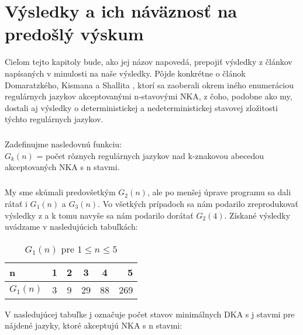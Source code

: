 \chapter{Výsledky a ich náväznosť na predošlý výskum}


Cieľom tejto kapitoly bude, ako jej názov napovedá, prepojiť výsledky z článkov napísaných v minulosti na naše výsledky. Pôjde konkrétne o článok Domaratzkého, Kismana a Shallita \cite{shallit}, ktorí sa zaoberali okrem iného enumeráciou regulárnych jazykov akceptovanými n-stavovými NKA, z čoho, podobne ako my, dostali aj výsledky o deterministickej a nedeterministickej stavovej zložitosti týchto regulárnych jazykov.

\paragraph{}
Zadefinujme nasledovnú funkciu:
\\
$G_k(n)$ = počet rôznych regulárnych jazykov nad k-znakovou abecedou akceptovaných NKA s n stavmi.
\paragraph{}
My sme skúmali predovšetkým $G_2(n)$, ale po menšej úprave programu sa dali rátať i $G_1(n)$ a $G_3(n)$. Vo všetkých prípadoch sa nám podarilo zreprodukovať výsledky z \cite{shallit} a k tomu navyše sa nám podarilo dorátať $G_2(4)$. Získané výsledky uvádzame v nasledujúcich tabuľkách:

\begin{table}[h]
  \centering
  \begin{tabular}{|l|c|c|c|c|r|}
    \hline
    n & 1 & 2 & 3 & 4 & 5 \\ 
    \hline
    $G_1(n)$ & 3 & 9 & 29 & 88 & 269 \\ 
    \hline
  \end{tabular}
  \caption{$G_1(n)$ pre $1 \leq n \leq 5$}
  \label{tab:G1n}
\end{table}

V nasledujúcej tabuľke j označuje počet stavov minimálnych DKA s j stavmi pre nájdené jazyky, ktoré akceptujú NKA s n stavmi:
\\
\\

